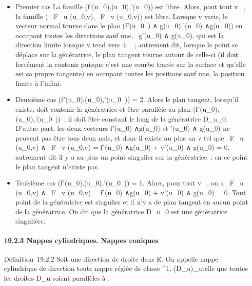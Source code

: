 \documentclass[]{article}
\begin{document}
\begin{itemize}
\itemsep1pt\parskip0pt
\item
  Premier cas La famille
  (f'(u\_0),\vecg(u\_0),\vecg'(u\_0))
  est libre. Alors, pout tout v \in {}~, la famille ( \partial~F
  \over \partial~u (u\_0,v), \partial~F \over
  \partial~v (u\_0,v)) est libre. Lorsque v varie, le vecteur normal
  tourne dans le plan
  \mathrmVect(f'(u\_0~)
  ∧\vec
  g(u\_0),\vecg'(u\_0)
  ∧\vec g(u\_0)) en occupant toutes les
  directions sauf une, ~g'(u\_0) ∧\vec
  g(u\_0), qui est la direction limite lorsque v tend vers
  ±\infty~~; autrement dit, lorsque le point se déplace sur la génératrice, le
  plan tangent tourne autour de celle-ci (il doit forcément la contenir
  puisque c'est une courbe tracée sur la surface et qu'elle est sa
  propre tangente) en occupant toutes les positions sauf une, la
  position limite à l'infini.
\item
  Deuxième cas
  \mathrmrg(f'(u\_0),\vecg(u\_0),\vecg'(u\_0~))
  = 2. Alors le plan tangent, lorsqu'il existe, doit contenir la
  génératrice et être parallèle au plan
  \mathrmVect(f'(u\_0),\vecg(u\_0),\vecg'(u\_0~))~;
  il doit être constant le long de la génératrice
  D\_u\_0. D'autre part, les deux vecteurs
  f'(u\_0) ∧\vec g(u\_0) et
  \vecg'(u\_0) ∧\vec
  g(u\_0) ne peuvent pas être tous deux nuls, et donc il
  existe au plus un v tel que  \partial~F \over \partial~u
  (u\_0,v) ∧ \partial~F \over \partial~v (u\_0,v) =
  f'(u\_0) ∧\vec g(u\_0) +
  v\vecg'(u\_0) ∧\vec
  g(u\_0) = 0, autrement dit il y a au plus un point singulier
  sur la génératrice~; en ce point le plan tangent n'existe pas.
\item
  Troisième cas
  \mathrmrg(f'(u\_0),\vecg(u\_0),\vecg'(u\_0~))
  = 1. Alors, pour tout v \in {}~, on a  \partial~F \over \partial~u
  (u\_0,v) ∧ \partial~F \over \partial~v (u\_0,v) =
  f'(u\_0) ∧\vec g(u\_0) +
  v\vecg'(u\_0) ∧\vec
  g(u\_0) = 0. Tout point de la génératrice est singulier et
  il n'y a de plan tangent en aucun point de la génératrice. On dit que
  la génératrice D\_u\_0 est une génératrice singulière.
\end{itemize}

\paragraph{19.2.3 Nappes cylindriques. Nappes coniques}

Définition~19.2.2 Soit \vecD une direction de droite
dans E. On appelle nappe cylindrique de direction
\vecD toute nappe réglée de classe ^1,
(D\_u)\_u\inI telle que toutes les droites D\_u
soient parallèles à \vecD.
\end{document}
